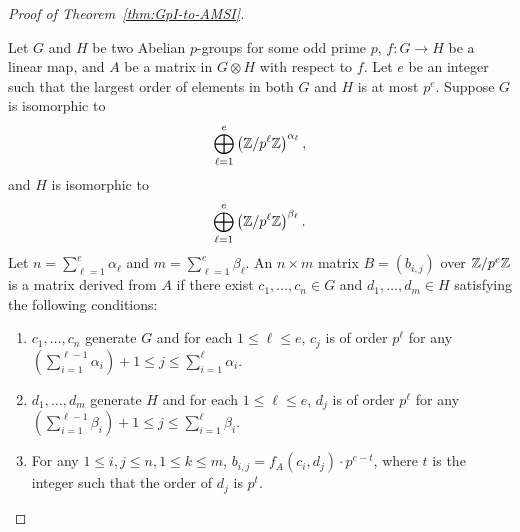\begin{proof}[Proof of Theorem~\ref{thm:GpI-to-AMSI}]
\begin{definition}
\end{definition}



\begin{definition}\label{def:matrix_from_group}
Let $G$ and $H$ be two Abelian $p$-groups for some odd prime $p$, 
$f: G \rightarrow H$ be a linear map, and  
$A$ be a matrix in $G \otimes H$ with respect to $f$. 
Let $e$ be an integer such that the largest order of elements in both $G$ and $H$ is at most $p^e$. 
Suppose $G$ is isomorphic to 
\[\bigoplus_{\ell = 1}^{e} \left(\mathbb{Z} / p^{\ell } \mathbb{Z}\right)^{\alpha_\ell},\]
and $H$ is isomorphic to 
\[\bigoplus_{\ell = 1}^{e} \left(\mathbb{Z} / p^{\ell } \mathbb{Z}\right)^{\beta_\ell}.\]
Let $n = \sum_{\ell = 1}^{e} \alpha_\ell$ and $m = \sum_{\ell = 1}^{e} \beta_\ell $. 
An $n \times m$ matrix  $B = (b_{i, j})$ over $\mathbb{Z} / p^e \mathbb{Z}$ is a matrix derived from $A$ if there exist
$c_1, \dots, c_n \in G$ and $d_1, \dots, d_m \in H$ satisfying the following conditions:
\begin{enumerate}
\item $c_1, \dots, c_n$ generate $G$ and for each $1 \leq \ell \leq e$, $c_{j}$ is of order $p^\ell$ for any $(\sum_{i = 1}^{\ell - 1} \alpha_i) + 1 \leq j \leq \sum_{i = 1}^{\ell} \alpha_i$. 
\item $d_1, \dots, d_m$ generate $H$ and for each $1 \leq \ell \leq e$, $d_{j}$ is of order $p^\ell$ for any $(\sum_{i = 1}^{\ell - 1} \beta_i) + 1 \leq j \leq \sum_{i = 1}^{\ell} \beta_i$. 
\item For any $1 \leq i, j \leq n, 1 \leq k \leq m$, $b_{i, j} = f_A(c_i, d_j)\cdot p^{e - t}$, where $t$ is the integer such that the order of $d_j$ is $p^t$. 
\end{enumerate}




\end{definition}
\end{proof}
